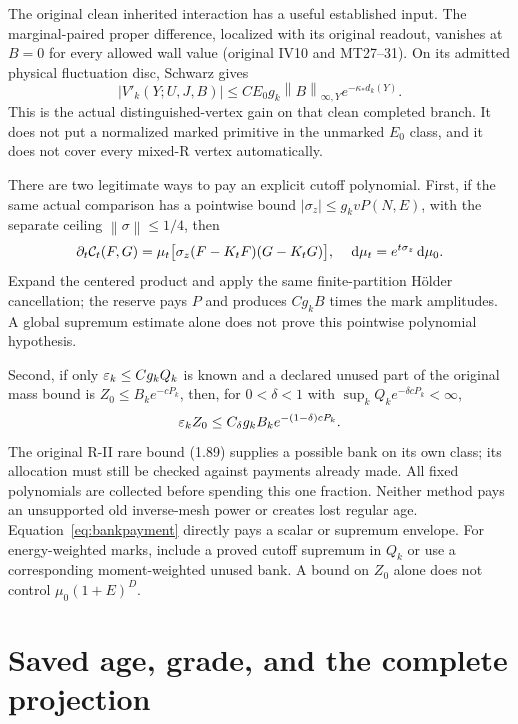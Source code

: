 \documentclass[11pt,letterpaper]{article}
\theoremstyle{plain}
\theoremstyle{remark}\newtheorem{remark}[theorem]{Scope}
\newcommand{\dd}{\,\mathrm d}\newcommand{\OH}{\mathcal O_H}
\newcommand{\norm}[1]{\left\lVert#1\right\rVert}
\begin{document}
The original clean inherited interaction has a useful established input.
The marginal-paired proper difference, localized with its original readout,
vanishes at $B=0$ for every allowed wall value (original IV10 and MT27--31).
On its admitted physical fluctuation disc, Schwarz gives
\begin{equation}
|V'_k(Y;U,J,B)|
\le C E_0g_k\norm B_{\infty,Y}e^{-\kappa_*d_k(Y)}.
\label{eq:actualvertex}
\end{equation}
This is the actual distinguished-vertex gain on that clean completed branch.
It does not put a normalized marked primitive in the unmarked $E_0$ class,
and it does not cover every mixed-R vertex automatically.

There are two legitimate ways to pay an explicit cutoff polynomial.
First, if the same actual comparison has a pointwise bound
$|\sigma_z|\le g_kvP(N,E)$, with the separate ceiling
$\norm\sigma\le1/4$, then
\begin{equation}
\partial_t\cC_t(F,G)
=\mu_t\bigl[\sigma_z(F-K_tF)(G-K_tG)\bigr],
\quad \dd\mu_t=e^{t\sigma_z}\dd\mu_0.
\label{eq:polynomialtilt}
\end{equation}
Expand the centered product and apply the same finite-partition H\"older
cancellation; the reserve pays $P$ and produces $C g_kB$ times the mark
amplitudes. A global supremum estimate alone does not prove this pointwise
polynomial hypothesis.

Second, if only $\varepsilon_k\le Cg_kQ_k$ is known and a declared unused part
of the original mass bound is $Z_0\le B_ke^{-cP_k}$, then, for
$0<\delta<1$ with $\sup_kQ_ke^{-\delta cP_k}<\infty$,
\begin{equation}
\varepsilon_kZ_0\le C_\delta g_kB_ke^{-(1-\delta)cP_k}.
\label{eq:bankpayment}
\end{equation}
The original R-II rare bound (1.89) supplies a possible bank on its own
class; its allocation must still be checked against payments already made.
All fixed polynomials are collected before spending this one fraction.
Neither method pays an unsupported old inverse-mesh power or creates lost
regular age.
Equation~\eqref{eq:bankpayment} directly pays a scalar or supremum envelope.
For energy-weighted marks, include a proved cutoff supremum in $Q_k$ or
use a corresponding moment-weighted unused bank. A bound on $Z_0$ alone
does not control $\mu_0(1+E)^D$.

\section{Saved age, grade, and the complete projection}
\label{sec:grade}
\end{document}
